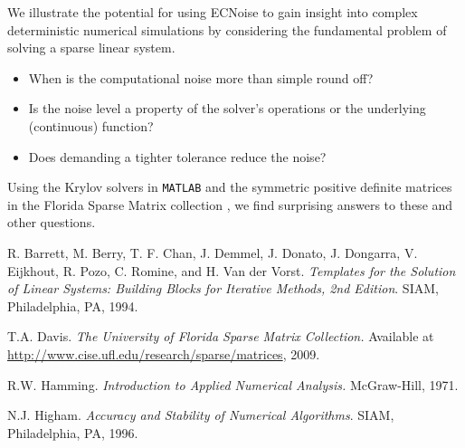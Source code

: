 \documentclass{report}
\begin{document}
We illustrate the potential for using \textsf{ECNoise} to gain insight
into complex deterministic numerical simulations by considering the
fundamental problem of solving a sparse linear system.
\begin{itemize}
\item When is the computational noise more than simple round off?
\item Is the noise level a property of the solver's operations or the
underlying (continuous) function?
\item Does demanding a tighter tolerance reduce the noise?
\end{itemize}
Using the Krylov solvers in \texttt{MATLAB} \cite{linearsys} and the
symmetric positive definite matrices in the Florida Sparse Matrix
collection \cite{ufmatrices}, we find surprising answers to these and
other questions.

\begin{thebibliography}{1}
 R. Barrett, M. Berry, T. F. Chan, J. Demmel, J.
Donato, J. Dongarra, V. Eijkhout, R. Pozo, C. Romine, and H. Van der
Vorst. {\em Templates for the Solution of Linear Systems: Building Blocks
for Iterative Methods, 2nd Edition}. SIAM, Philadelphia, PA, 1994.

 T.A. Davis. {\em The University of Florida Sparse
Matrix Collection.} Available at
\url{http://www.cise.ufl.edu/research/sparse/matrices}, 2009.

 R.W. Hamming. {\em Introduction to Applied
Numerical Analysis.} McGraw-Hill, 1971.

 N.J. Higham. {\em Accuracy and Stability of
Numerical Algorithms}. SIAM, Philadelphia, PA, 1996.
\end{thebibliography}
\end{document}
